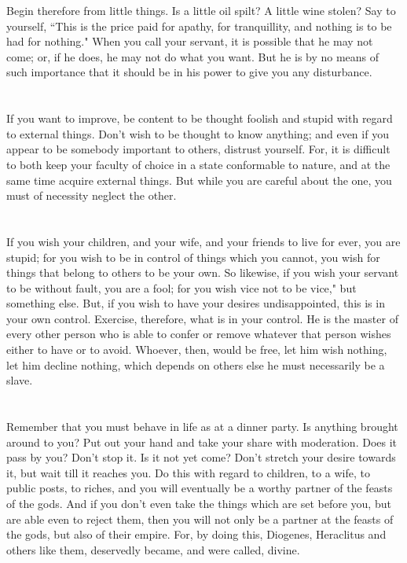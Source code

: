\documentclass[12pt]{article}
\begin{document}
Begin therefore from little things. Is a little oil spilt? A little
wine stolen? Say to yourself, ``This is the price paid for apathy,
for tranquillity, and nothing is to be had for nothing." When you
call your servant, it is possible that he may not come; or, if he
does, he may not do what you want. But he is by no means of such importance
that it should be in his power to give you any disturbance.

\section{}

If you want to improve, be content to be thought foolish and stupid
with regard to external things. Don't wish to be thought to know anything;
and even if you appear to be somebody important to others, distrust
yourself. For, it is difficult to both keep your faculty of choice
in a state conformable to nature, and at the same time acquire external
things. But while you are careful about the one, you must of necessity
neglect the other. 

\section{}

If you wish your children, and your wife, and your friends to
live for ever, you are stupid; for you wish to be in control of things
which you cannot, you wish for things that belong to others to be
your own. So likewise, if you wish your servant to be without fault,
you are a fool; for you wish vice not to be vice," but something else.
But, if you wish to have your desires undisappointed, this is in your
own control. Exercise, therefore, what is in your control. He is the
master of every other person who is able to confer or remove whatever
that person wishes either to have or to avoid. Whoever, then, would
be free, let him wish nothing, let him decline nothing, which depends
on others else he must necessarily be a slave. 

\section{}

Remember that you must behave in life as at a dinner party. Is
anything brought around to you? Put out your hand and take your share
with moderation. Does it pass by you? Don't stop it. Is it not yet
come? Don't stretch your desire towards it, but wait till it reaches
you. Do this with regard to children, to a wife, to public posts,
to riches, and you will eventually be a worthy partner of the feasts
of the gods. And if you don't even take the things which are set before
you, but are able even to reject them, then you will not only be a
partner at the feasts of the gods, but also of their empire. For,
by doing this, Diogenes, Heraclitus and others like them, deservedly
became, and were called, divine. 
\end{document}
